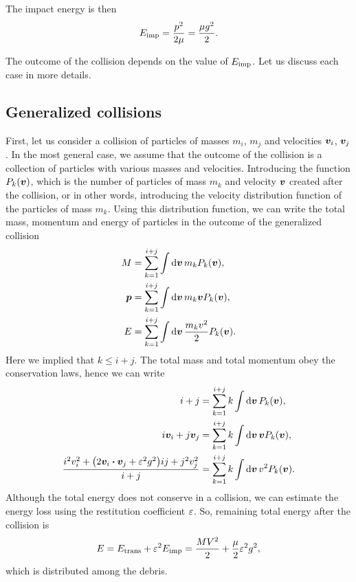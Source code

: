 \documentclass[aps,prl,preprint,groupedaddress,10pt]{revtex4-2}
\begin{document}
The impact energy is then
\begin{equation}
    E_{\mathrm{imp}}=\frac{p^2}{2\mu}=\frac{\mu g^2}{2}.
\end{equation}

The outcome of the collision depends on the value of $E_{\mathrm{imp}}$. Let us discuss each 
case in more details.

\subsection{Generalized collisions}
First, let us consider a collision of particles of masses $m_i$, $m_j$ and 
velocities $\vb*{v}_i$, $\vb*{v}_j$. In the most general case, we assume that
the outcome of the collision is a collection of particles with various masses and 
velocities. Introducing the function $P_k\pqty{\bv}$, which is the number of 
particles of mass $m_k$ and velocity $\vb*{v}$ created after the collision, 
or in other words, introducing the velocity distribution function of the particles of 
mass $m_k$. Using this distribution function, we can write the total mass, momentum and 
energy of particles in the outcome of the generalized collision
\begin{equation}
    \begin{split}
        M &= \sum_{k=1}^{i+j}\int\dd{\bv}m_kP_k\pqty{\bv},\\
        \bp &= \sum_{k=1}^{i+j}\int\dd{\bv}m_k\bv P_k\pqty{\bv},\\
        E &= \sum_{k=1}^{i+j}\int\dd{\bv}\frac{m_kv^2}{2}P_k\pqty{\bv}.
    \end{split}
\end{equation}
Here we implied that $k\leqslant i+j$. The total mass and total momentum obey the 
conservation laws, hence we can write
\begin{equation}
    \begin{split}
        i+j &= \sum_{k=1}^{i+j}k\int\dd{\bv}P_k\pqty{\bv},\\
        i\bv_i+j\bv_j &= \sum_{k=1}^{i+j}k\int\dd{\bv}\bv P_k\pqty{\bv},\\
        \frac{i^2v_i^2+\pqty{2\bv_i\vdot\bv_j+\eps^2g^2}ij+j^2v_j^2}{i+j} &= 
        \sum_{k=1}^{i+j}k\int\dd{\bv}v^2P_k\pqty{\bv}.
    \end{split}
\end{equation}
Although the total energy does not conserve in a collision, we can estimate the energy 
loss using the restitution coefficient $\varepsilon$. So, remaining total energy after the 
collision is 
\begin{equation}
    E=E_{\mathrm{trans}}+\varepsilon^2E_{\mathrm{imp}}=\frac{MV^2}{2}+\frac{\mu}{2}\varepsilon^2g^2,
\end{equation}
which is distributed among the debris. 
\end{document}
